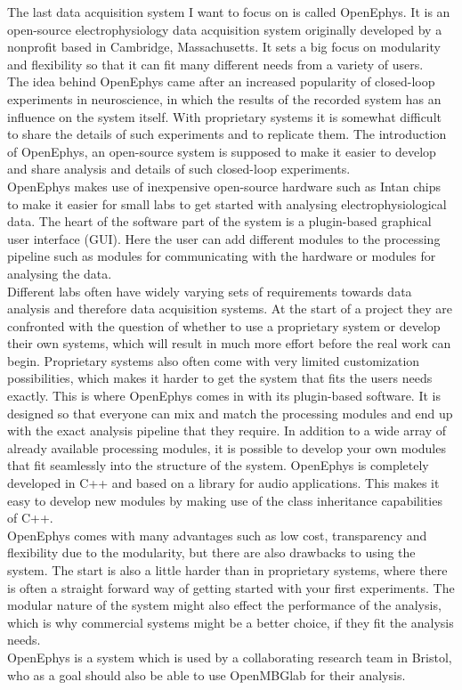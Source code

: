 The last data acquisition system I want to focus on is called OpenEphys. It is an open-source electrophysiology data acquisition system originally developed by a nonprofit based in Cambridge, Massachusetts. It sets a big focus on modularity and flexibility so that it can fit many different needs from a variety of users.\\

The idea behind OpenEphys came after an increased popularity of closed-loop experiments in neuroscience, in which the results of the recorded system has an influence on the system itself. With proprietary systems it is somewhat difficult to share the details of such experiments and to replicate them. The introduction of OpenEphys, an open-source system is supposed to make it easier to develop and share analysis and details of such closed-loop experiments.\\
OpenEphys makes use of inexpensive open-source hardware such as Intan chips to make it easier for small labs to get started with analysing electrophysiological data. The heart of the software part of the system is a plugin-based graphical user interface (GUI). Here the user can add different modules to the processing pipeline such as modules for communicating with the hardware or modules for analysing the data.\\
Different labs often have widely varying sets of requirements towards data analysis and therefore data acquisition systems. At the start of a project they are confronted with the question of whether to use a proprietary system or develop their own systems, which will result in much more effort before the real work can begin. Proprietary systems also often come with very limited customization possibilities, which makes it harder to get the system that fits the users needs exactly. This is where OpenEphys comes in with its plugin-based software. It is designed so that everyone can mix and match the processing modules and end up with the exact analysis pipeline that they require. In addition to a wide array of already available processing modules, it is possible to develop your own modules that fit seamlessly into the structure of the system. OpenEphys is completely developed in C++ and based on a library for audio applications. This makes it easy to develop new modules by making use of the class inheritance capabilities of C++.\\
OpenEphys comes with many advantages such as low cost, transparency and flexibility due to the modularity, but there are also drawbacks to using the system. The start is also a little harder than in proprietary systems, where there is often a straight forward way of getting started with your first experiments. The modular nature of the system might also effect the performance of the analysis, which is why commercial systems might be a better choice, if they fit the analysis needs.\\
OpenEphys is a system which is used by a collaborating research team in Bristol, who as a goal should also be able to use OpenMBGlab for their analysis.

